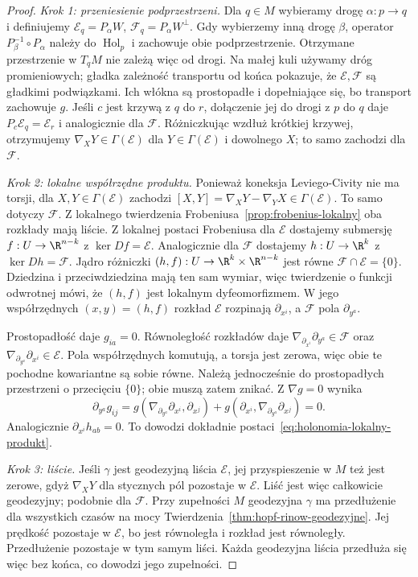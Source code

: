 \begin{proof}
\emph{Krok 1: przeniesienie podprzestrzeni.}
Dla $q\in M$ wybieramy drogę $\alpha:p\to q$ i
definiujemy $\mathcal E_q=P_\alpha W$,
$\mathcal F_q=P_\alpha W^\perp$. Gdy wybierzemy inną
drogę $\beta$, operator $P_\beta^{-1}\circ P_\alpha$
należy do $\operatorname{Hol}_p$ i zachowuje obie
podprzestrzenie. Otrzymane przestrzenie w $T_qM$
nie zależą więc od drogi. Na małej kuli używamy dróg
promieniowych; gładka zależność transportu od końca
pokazuje, że $\mathcal E,\mathcal F$ są gładkimi
podwiązkami. Ich włókna są prostopadłe i dopełniające się,
bo transport zachowuje $g$. Jeśli $c$ jest krzywą
z $q$ do $r$, dołączenie jej do drogi z $p$ do $q$
daje $P_c\mathcal E_q=\mathcal E_r$ i analogicznie
dla $\mathcal F$. Różniczkując wzdłuż krótkiej krzywej,
otrzymujemy $\nabla_XY\in\Gamma(\mathcal E)$ dla
$Y\in\Gamma(\mathcal E)$ i dowolnego $X$; to samo
zachodzi dla $\mathcal F$.

\emph{Krok 2: lokalne współrzędne produktu.}
Ponieważ koneksja Leviego-Civity nie ma torsji,
dla $X,Y\in\Gamma(\mathcal E)$ zachodzi
$[X,Y]=\nabla_XY-\nabla_YX\in\Gamma(\mathcal E)$.
To samo dotyczy $\mathcal F$. Z lokalnego twierdzenia
Frobeniusa~\ref{prop:frobenius-lokalny} oba rozkłady
mają liście. Z lokalnej postaci Frobeniusa dla
$\mathcal E$ dostajemy submersję
$f:U\to\R^{n-k}$ z $\ker Df=\mathcal E$.
Analogicznie dla $\mathcal F$ dostajemy
$h:U\to\R^k$ z $\ker Dh=\mathcal F$.
Jądro różniczki $(h,f):U\to\R^k\times\R^{n-k}$
jest równe $\mathcal F\cap\mathcal E=\{0\}$.
Dziedzina i przeciwdziedzina mają ten sam wymiar,
więc twierdzenie o funkcji odwrotnej mówi, że $(h,f)$
jest lokalnym dyfeomorfizmem. W jego współrzędnych
$(x,y)=(h,f)$ rozkład $\mathcal E$ rozpinają
$\partial_{x^i}$, a $\mathcal F$ pola $\partial_{y^a}$.

Prostopadłość daje $g_{ia}=0$. Równoległość rozkładów
daje $\nabla_{\partial_{x^i}}\partial_{y^a}\in\mathcal F$
oraz $\nabla_{\partial_{y^a}}\partial_{x^i}\in\mathcal E$.
Pola współrzędnych komutują, a torsja jest zerowa, więc
obie te pochodne kowariantne są sobie równe. Należą
jednocześnie do prostopadłych przestrzeni o przecięciu
$\{0\}$; obie muszą zatem znikać. Z $\nabla g=0$ wynika
\[
 \partial_{y^a}g_{ij}
 =g(\nabla_{\partial_{y^a}}\partial_{x^i},
                         \partial_{x^j})
  +g(\partial_{x^i},
     \nabla_{\partial_{y^a}}\partial_{x^j})=0.
\]
Analogicznie $\partial_{x^i}h_{ab}=0$.
To dowodzi dokładnie postaci~\eqref{eq:holonomia-lokalny-produkt}.

\emph{Krok 3: liście.} Jeśli $\gamma$ jest geodezyjną
liścia $\mathcal E$, jej przyspieszenie w $M$ też jest
zerowe, gdyż $\nabla_XY$ dla stycznych pól pozostaje
w $\mathcal E$. Liść jest więc całkowicie geodezyjny;
podobnie dla $\mathcal F$. Przy zupełności $M$
geodezyjna $\gamma$ ma przedłużenie dla wszystkich
czasów na mocy Twierdzenia~\ref{thm:hopf-rinow-geodezyjne}.
Jej prędkość pozostaje w $\mathcal E$, bo jest
równoległa i rozkład jest równoległy. Przedłużenie
pozostaje w tym samym liści. Każda geodezyjna liścia
przedłuża się więc bez końca, co dowodzi jego zupełności.
\end{proof}

